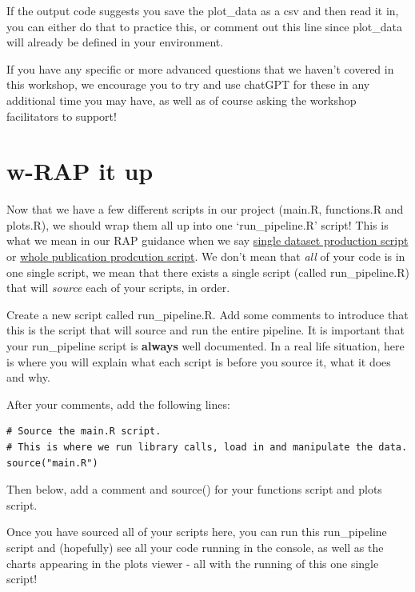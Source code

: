 \documentclass[
  12pt,
]{article}
\begin{document}
If the output code suggests you save the plot\_data as a csv and then
read it in, you can either do that to practice this, or comment out this
line since plot\_data will already be defined in your environment.

If you have any specific or more advanced questions that we haven't
covered in this workshop, we encourage you to try and use chatGPT for
these in any additional time you may have, as well as of course asking
the workshop facilitators to support!

\hypertarget{w-rap-it-up}{%
\section{w-RAP it up}\label{w-rap-it-up}}

Now that we have a few different scripts in our project (main.R,
functions.R and plots.R), we should wrap them all up into one
`run\_pipeline.R' script! This is what we mean in our RAP guidance when
we say
\href{https://rsconnect/rsc/stats-production-guidance/rap.html\#dataset-production-scripts}{single
dataset production script} or
\href{https://rsconnect/rsc/stats-production-guidance/rap.html\#whole-publication-production-scripts}{whole
publication prodcution script}. We don't mean that \emph{all} of your
code is in one single script, we mean that there exists a single script
(called run\_pipeline.R) that will \emph{source} each of your scripts,
in order.

Create a new script called run\_pipeline.R. Add some comments to
introduce that this is the script that will source and run the entire
pipeline. It is important that your run\_pipeline script is
\textbf{always} well documented. In a real life situation, here is where
you will explain what each script is before you source it, what it does
and why.

After your comments, add the following lines:

\begin{verbatim}
# Source the main.R script. 
# This is where we run library calls, load in and manipulate the data. 
source("main.R")
\end{verbatim}

Then below, add a comment and source() for your functions script and
plots script.

Once you have sourced all of your scripts here, you can run this
run\_pipeline script and (hopefully) see all your code running in the
console, as well as the charts appearing in the plots viewer - all with
the running of this one single script!
\end{document}
